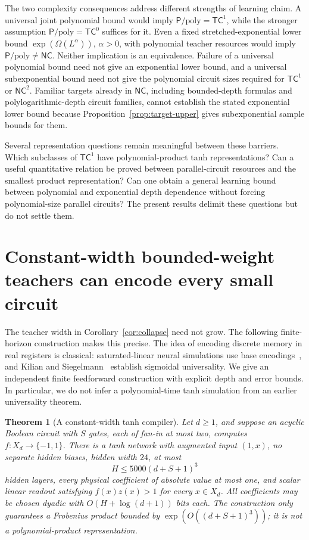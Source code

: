 \documentclass[11pt]{article}
\newtheorem{theorem}{Theorem}[section]
\theoremstyle{remark}
\newcommand{\TC}{\mathsf{TC}}
\newcommand{\NC}{\mathsf{NC}}
\newcommand{\Ppoly}{\mathsf{P}/\mathrm{poly}}
\begin{document}
The two complexity consequences address different strengths of
learning claim. A universal joint polynomial bound would imply
$\Ppoly=\TC^1$, while the stronger assumption
$\Ppoly=\TC^0$ suffices for it. Even a fixed stretched-exponential lower bound
$\exp(\Omega(L^\alpha))$, $\alpha>0$, with polynomial teacher
resources would imply $\Ppoly\ne\NC$. Neither implication
is an equivalence. Failure of a universal polynomial bound need not
give an exponential lower bound, and a universal subexponential
bound need not give the polynomial circuit sizes required for
$\TC^1$ or $\NC^2$. Familiar targets already in $\NC$, including
bounded-depth formulas and polylogarithmic-depth circuit families,
cannot establish the stated exponential lower bound because
Proposition~\ref{prop:target-upper} gives subexponential sample bounds
for them.

Several representation questions remain meaningful between these
barriers. Which subclasses of $\TC^1$ have polynomial-product tanh
representations? Can a useful quantitative relation be proved between
parallel-circuit resources and the smallest product representation?
Can one obtain a general learning bound between polynomial and
exponential depth dependence without forcing polynomial-size
parallel circuits? The present results delimit these questions but
do not settle them.

\appendix
\section{Constant-width bounded-weight teachers can encode every small circuit}
\label{app:constant-width}

The teacher width in Corollary~\ref{cor:collapse} need not grow.
The following finite-horizon construction makes this precise. The idea of
encoding discrete memory in real registers is classical: saturated-linear
neural simulations use base encodings~\cite{siegelmann-sontag}, and
Kilian and Siegelmann~\cite{kilian-siegelmann} establish sigmoidal
universality. We give an independent finite feedforward construction with
explicit depth and error bounds. In particular, we do not infer a
polynomial-time tanh simulation from an earlier universality theorem.

\begin{theorem}[A constant-width tanh compiler]
\label{thm:constant-width-compiler}
Let $d\ge1$, and suppose an acyclic Boolean circuit with $S$ gates,
each of fan-in at most two, computes $f:X_d\to\{-1,1\}$.
There is a tanh network with augmented input $(1,x)$, no separate
hidden biases, hidden width $24$, at most
\[
 H\le5000(d+S+1)^3
\]
hidden layers, every physical coefficient of absolute value at most one,
and scalar linear readout satisfying $f(x)z(x)>1$ for every $x\in X_d$.
All coefficients may be chosen dyadic with
$O(H+\log(d+1))$ bits each.
The construction only guarantees a Frobenius product bounded by
$\exp(O((d+S+1)^3))$; it is not a polynomial-product representation.
\end{theorem}
\end{document}
